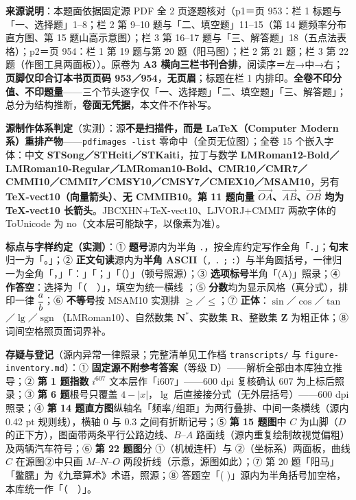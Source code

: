 


\begin{gktip}
\textbf{来源说明}：本题面依据固定源 PDF 全 2 页逐题核对（p1＝页 953：栏 1 标题与「一、选择题」1–8；栏 2 第 9–10 题与「二、填空题」11–15（第 14 题频率分布直方图、第 15 题山高示意图）；栏 3 第 16–17 题与「三、解答题」18（五点法表格）；p2＝页 954：栏 1 第 19 题与第 20 题（阳马图）；栏 2 第 21 题；栏 3 第 22 题（作图工具两面板））。原卷为 \textbf{A3 横向三栏书刊合排}，阅读序＝左→中→右；\textbf{页脚仅印合订本书页页码 953／954}，\textbf{无页眉}；标题在栏 1 内排印。\textbf{全卷不印分值、不印题量}——三个节头逐字仅「一、选择题」「二、填空题」「三、解答题」；总分为结构推断，\textbf{卷面无凭据}，本文件不作补写。

\textbf{源制作体系判定}（实测）：源\textbf{不是扫描件，而是 LaTeX（Computer Modern 系）重排产物}——\texttt{pdfimages -list} 零命中（全页无位图）；全卷 15 个嵌入字体：中文 \textbf{STSong／STHeiti／STKaiti}，拉丁与数学 \textbf{LMRoman12-Bold／LMRoman10-Regular／LMRoman10-Bold、CMR10／CMR7／CMMI10／CMMI7／CMSY10／CMSY7／CMEX10／MSAM10}，另有 \textbf{TeX-vect10（向量箭头）}、\textbf{无 CMMIB10}。\textbf{第 11 题向量 \(\overrightarrow{OA}\)、\(\overrightarrow{AB}\)、\(\overrightarrow{OB}\) 均为 TeX-vect10 长箭头}。JBCXHN+TeX-vect10、LJVORJ+CMMI7 两款字体的 ToUnicode 为 no（文本层可能缺字，以像素为准）。

\textbf{标点与字样约定（实测）}：① \textbf{题号}源内为半角 \texttt{.}，按全库约定写作全角「．」；\textbf{句末}归一为「。」；② \textbf{正文句读}源内为\textbf{半角 ASCII}（\texttt{,} \texttt{.} \texttt{;} \texttt{:}）与半角圆括号，一律归一为全角「，」「：」「；」「（）」（顿号照源）；③ \textbf{选项标号}半角「(A)」照录；④ \textbf{作答空}：选择为「（　）」，填空为统一横线 \texttt{\gkblank{}}；⑤ \textbf{分数}均为显示风格（真分式），排印一律 \(\dfrac{a}{b}\)；⑥ \textbf{不等号}按 MSAM10 实测排 \(\geqslant\)／\(\leqslant\)；⑦ \textbf{正体}：\(\sin\)／\(\cos\)／\(\tan\)／\(\lg\)／\(\operatorname{sgn}\)（LMRoman10）、自然数集 \(\mathbf{N}^*\)、实数集 \(\mathbf{R}\)、整数集 \(\mathbf{Z}\) 为粗正体；⑧ 词间空格照页面词界补。

\textbf{存疑与登记}（源内异常一律照录；完整清单见工作档 \texttt{transcripts/} 与 \texttt{figure-inventory.md}）：① \textbf{固定源不附参考答案}（等级 D）——解析全部由本库独立推导；② \textbf{第 1 题指数} \(i^{607}\) 文本层作「i607」——600 dpi 复核确认 607 为上标后照录；③ \textbf{第 6 题}根号只覆盖 \(4-|x|\)，\(\lg\) 后直接接分式（无外层括号）——600 dpi 照录；④ \textbf{第 14 题直方图}纵轴名「频率/组距」为两行叠排、中间一条横线（源内 0.42 pt 规则线），横轴 0 与 0.3 之间有折断记号；⑤ \textbf{第 15 题图}中 \(C\) 为山脚（\(D\) 的正下方），图面带两条平行公路边线、\(B\)–\(A\) 路面线（源内重复绘制故视觉偏粗）及两辆汽车符号；⑥ \textbf{第 22 题图}分 ①（机械连杆）与 ②（坐标系）两面板，曲线 \(C\) 在源图②中只画 \(M\)–\(N\)–\(O\) 两段折线（示意，源图如此）；⑦ 第 20 题「阳马」「鳖臑」为《九章算术》术语，照源；⑧ 答题空「( )」源内为半角括号加空格，本库统一作「（　）」。
\end{gktip}

